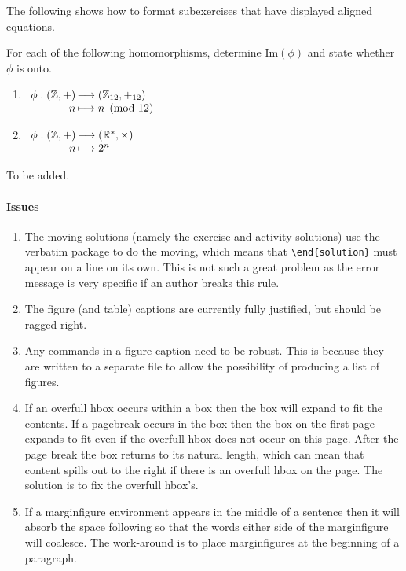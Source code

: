 \documentclass[solutionsatend]{ouunit}
\begin{document}
The following shows how to format subexercises that have displayed aligned equations.
\begin{exercise}
For each of the following homomorphisms, determine \(\mathrm{Im}(\phi)\) and state whether \(\phi\) is onto.
\begin{enumerate}
\item \(\begin{array}[t]{r@{\,}l}
\phi:(\mathbb{Z},+)&\longrightarrow (\mathbb{Z}_{12},+_{12})\\
  n&\longmapsto n\pmod{12}
  \end{array}\)
\item \(\begin{array}[t]{r@{\,}l}
\phi:(\mathbb{Z},+)&\longrightarrow (\mathbb{R}^*,\times)\\
  n&\longmapsto 2^n
  \end{array}\)
\end{enumerate}
\begin{solution}
To be added.
\end{solution}
\end{exercise}

\paragraph{Issues}
\begin{enumerate}
\item
The moving solutions (namely the exercise and activity solutions) use the verbatim package to do the moving, which means that \verb”\end{solution}” must appear on a line on its own. This is not such a great problem as the error message is very specific if an author breaks this rule.
\item
The figure (and table) captions are currently fully justified, but should be ragged right.
\item
Any commands in a figure caption need to be robust. This is because they are written to a separate file to allow the possibility of producing a list of figures.
\item
If an overfull hbox occurs within a box then the box will expand to fit the contents. If a pagebreak occurs in the box then the box on the first page expands to fit even if the overfull hbox does not occur on this page. After the page break the box returns to its natural length, which can mean that content spills out to the right if there is an overfull hbox on the page. The solution is to fix the overfull hbox's.
\item
If a marginfigure environment appears in the middle of a sentence then it will absorb the space following so that the words either side of the marginfigure will coalesce. The work-around is to place marginfigures at the beginning of a paragraph.

\end{enumerate}
\end{document}
